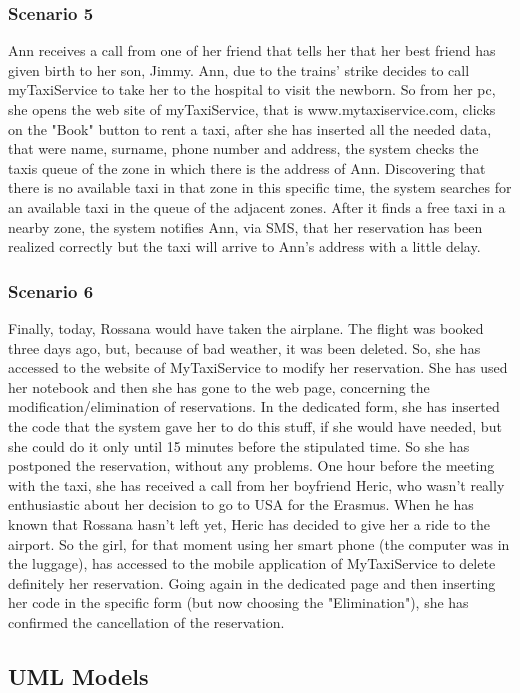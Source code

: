 		\subsubsection{Scenario 5}
		Ann receives a call from one of her friend that tells her that her best friend has given birth to her son, Jimmy. Ann, due to the trains' strike decides to call myTaxiService to take her to the hospital to visit the newborn. So from her pc, she opens the web site of myTaxiService, that is www.mytaxiservice.com, clicks on the "Book" button to rent a taxi, after she has inserted all the needed data, that were name, surname, phone number and address, the system checks the taxis queue of the zone in which there is the address of Ann. Discovering that there is no available taxi in that zone in this specific time, the system searches for an available taxi in the queue of the adjacent zones. After it finds a free taxi in a nearby zone, the system notifies Ann, via SMS, that her reservation has been realized correctly but the taxi will arrive to Ann's address with a little delay. 
		
		\subsubsection{Scenario 6}
		Finally, today, Rossana would have taken the airplane. The flight was booked three days ago, but, because of bad weather, it was been deleted. So, she has accessed to the website of MyTaxiService to modify her reservation. She has used her notebook and then she has gone to the web page, concerning the modification/elimination of reservations. In the dedicated form, she has inserted the code that the system gave her to do this stuff, if she would have needed, but she could do it only until 15 minutes before the stipulated time. So she has postponed the reservation, without any problems.
		One hour before the meeting with the taxi, she has received a call from her boyfriend Heric, who wasn't really enthusiastic about her decision to go to USA for the Erasmus. When he has known that Rossana hasn't left yet, Heric has decided to give her a ride to the airport. So the girl, for that moment using her smart phone (the computer was in the luggage), has accessed to the mobile application of MyTaxiService to delete definitely her reservation. Going again in the dedicated page and then inserting her code in the specific form (but now choosing the "Elimination"), she has confirmed the cancellation of the reservation. 
	\newpage
	\subsection{UML Models}
		
		\newpage
		
		\newpage
		
		

